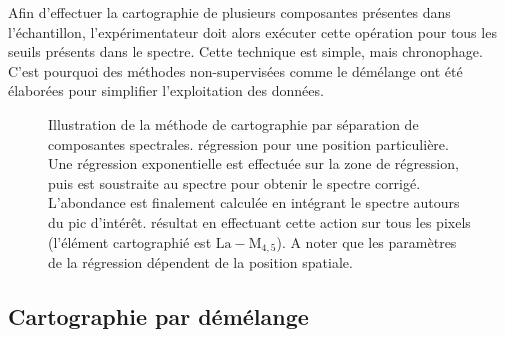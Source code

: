     Afin d'effectuer la cartographie de plusieurs composantes présentes dans l'échantillon, l'expérimentateur doit alors exécuter cette opération pour tous les seuils présents dans le spectre. Cette technique est simple, mais chronophage. C'est pourquoi des méthodes non-supervisées comme le démélange ont été élaborées pour simplifier l'exploitation des données.

    \begin{figure}
        \centering
        \hspace{1em}
        \caption{Illustration de la méthode de cartographie par séparation de composantes spectrales. \protect{} régression pour une position particulière. Une régression exponentielle est effectuée sur la zone de régression, puis est soustraite au spectre pour obtenir le spectre corrigé. L'abondance est finalement calculée en intégrant le spectre autours du pic d'intérêt. \protect{} résultat en effectuant cette action sur tous les pixels (l'élément cartographié est $\mathrm{La-M}_{4, 5}$). A noter que les paramètres de la régression dépendent de la position spatiale.
            \protect\label{fig-carto-separation}}
    \end{figure}

    \subsection{Cartographie par démélange}

